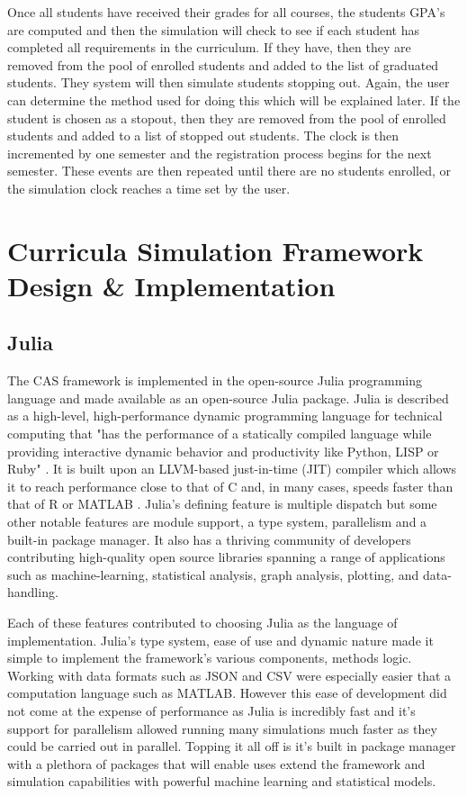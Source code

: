 \documentclass[botnum, fleqn]{unmeethesis}
\begin{document}
Once all students have received their grades for all courses, the students GPA's are computed and then the simulation will check to see if each student has completed all requirements in the curriculum. If they have, then they are removed from the pool of enrolled students and added to the list of graduated students. They system will then simulate students stopping out. Again, the user can determine the method used for doing this which will be explained later. If the student is chosen as a stopout, then they are removed from the pool of enrolled students and added to a list of stopped out students. The clock is then incremented by one semester and the registration process begins for the next semester. These events are then repeated until there are no students enrolled, or the simulation clock reaches a time set by the user.


\chapter{Curricula Simulation Framework Design \& Implementation}

  \section{Julia}
  The CAS framework is implemented in the open-source Julia programming language and made available as an open-source Julia package. Julia is described as a high-level, high-performance dynamic programming language for technical computing that "has the performance of a statically compiled language while providing interactive dynamic behavior and productivity like Python, LISP or Ruby" \cite{Julia}. It is built upon an LLVM-based just-in-time (JIT) compiler which allows it to reach performance close to that of C and, in many cases, speeds faster than that of R or MATLAB \cite{Julia}. Julia's defining feature is multiple dispatch but some other notable features are module support, a type system, parallelism and a built-in package manager. It also has a thriving community of developers contributing high-quality open source libraries spanning a range of applications such as machine-learning, statistical analysis, graph analysis, plotting, and data-handling.

  Each of these features contributed to choosing Julia as the language of implementation. Julia's type system, ease of use and dynamic nature made it simple to implement the framework's various components, methods logic. Working with data formats such as JSON and CSV were especially easier that a computation language such as MATLAB. However this ease of development did not come at the expense of performance as Julia is incredibly fast and it's support for parallelism allowed running many simulations much faster as they could be carried out in parallel. Topping it all off is it's built in package manager with a plethora of packages that will enable uses extend the framework and simulation capabilities with powerful machine learning and statistical models.
\end{document}
